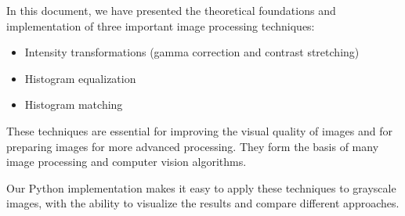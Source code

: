 \documentclass[12pt,a4paper]{article}
\begin{document}
In this document, we have presented the theoretical foundations and implementation of three important image processing techniques:
\begin{itemize}
    \item Intensity transformations (gamma correction and contrast stretching)
    \item Histogram equalization
    \item Histogram matching
\end{itemize}

These techniques are essential for improving the visual quality of images and for preparing images for more advanced processing. They form the basis of many image processing and computer vision algorithms.

Our Python implementation makes it easy to apply these techniques to grayscale images, with the ability to visualize the results and compare different approaches.
\end{document}
